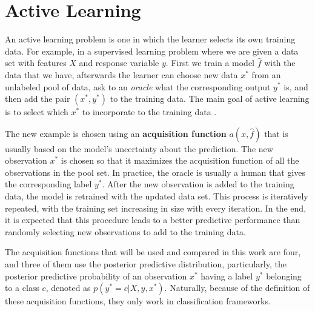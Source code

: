 
\chapter{Active Learning}
\label{ch:active_learning}



An active learning problem is one in which the learner selects its own training data. For example, in a supervised learning problem where we are given a data set with features $X$ and response variable $y$. First we train a model $\hat{f}$ with the data that we have, afterwards the learner can choose new data $x^*$ from an unlabeled pool of data, ask to an \textit{oracle} what the corresponding output $y^*$ is, and then add the pair $(x^*, y^*)$ to the training data. The main goal of active learning is to select which $x^*$ to incorporate to the training data \cite{cohn1996active}.

The new example is chosen using an \textbf{acquisition function} $a(x, \hat{f})$ that is usually based on the model's uncertainty about the prediction. The new observation $x^*$ is chosen so that it maximizes the acquisition function of all the observations in the pool set. In practice, the oracle is usually a human that gives the corresponding label $y^*$. After the new observation is added to the training data, the model is retrained with the updated data set. This process is iteratively repeated, with the training set increasing in size with every iteration. In the end, it is expected that this procedure leads to a better predictive performance than randomly selecting new observations to add to the training data.

The acquisition functions that will be used and compared in this work are four, and three of them use the posterior predictive distribution, particularly, the posterior predictive probability of an observation $x^*$ having a label $y^*$ belonging to a class $c$, denoted as  $p(y^* = c | X, y, x^*)$. Naturally, because of the definition of these acquisition functions, they only work in classification frameworks.

